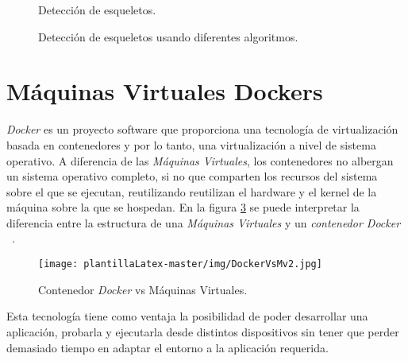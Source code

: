 \begin{figure}[H]
\centering
 \caption{Detección de esqueletos.}
 \label{f:f_esq2}
\end{figure}


\begin{figure}[H]
 \centering
  \vspace{1mm}
  \vspace{1mm}
 \caption{Detección de esqueletos usando diferentes algoritmos.}
 \label{f:f_esq}
\end{figure}


\newpage
\section{Máquinas Virtuales Dockers}
\emph{Docker} es un proyecto software que proporciona una tecnología de virtualización basada en contenedores y por lo tanto, una virtualización a nivel de sistema operativo. A diferencia de las \textit{Máquinas Virtuales}, los contenedores no albergan un sistema operativo completo, si no que comparten los recursos del sistema sobre el que se ejecutan, reutilizando reutilizan el hardware y el kernel de la máquina sobre la que se hospedan. En la figura \ref{fig:M-V} se puede interpretar la diferencia entre la estructura de una \textit{Máquinas Virtuales} y un \textit{contenedor Docker} ~\cite{docker}.

\begin{figure}[H]
    \centering
    \texttt{[image: plantillaLatex-master/img/DockerVsMv2.jpg]}
    \caption{Contenedor \textit{Docker} vs Máquinas Virtuales.}
    \label{fig:M-V}
\end{figure}


Esta tecnología tiene como ventaja la posibilidad de poder desarrollar una aplicación, probarla y ejecutarla desde distintos dispositivos sin tener que perder demasiado tiempo en adaptar el entorno a la aplicación requerida.

